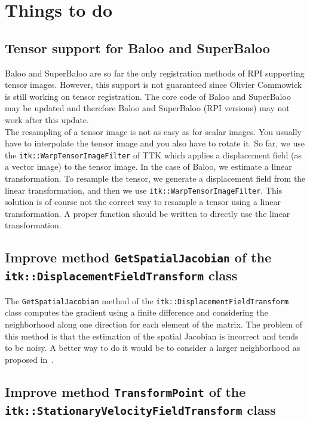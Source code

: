 \section{Things to do}



\subsection{Tensor support for Baloo and SuperBaloo}

Baloo and SuperBaloo are so far the only registration methods of RPI supporting tensor images. However, this support is not guaranteed since Olivier Commowick is still working on tensor registration. The core code of Baloo and SuperBaloo may be updated and therefore Baloo and SuperBaloo (RPI versions) may not work after this update.
\\
The resampling of a tensor image is not as easy as for scalar images. You usually have to interpolate the tensor image and you also have to rotate it. So far, we use the \texttt{itk::WarpTensorImageFilter} of TTK which applies a displacement field (as a vector image) to the tensor image. In the case of Baloo, we estimate a linear transformation. To resample the tensor, we generate a displacement field from the linear transformation, and then we use \texttt{itk::WarpTensorImageFilter}. This solution is of course not the correct way to resample a tensor using a linear transformation. A proper function should be written to directly use the linear transformation.



\subsection{Improve method \texttt{GetSpatialJacobian} of the \texttt{itk::\-Displacement\-Field\-Transform} class}

The \texttt{GetSpatialJacobian} method of the \texttt{itk::\-Displacement\-Field\-Transform} class computes the gradient using a finite difference and considering the neighborhood along one direction for each element of the matrix. The problem of this method is that the estimation of the spatial Jacobian is incorrect and tends to be noisy. A better way to do it would be to consider a larger neighborhood as proposed in~\cite{Pennec_report_2004}.



\subsection{Improve method \texttt{TransformPoint} of the \texttt{itk::\-Stationary\-Velocity\-Field\-Transform} class}

